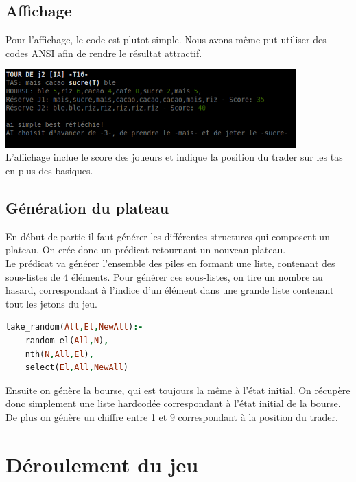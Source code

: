 \documentclass[11pt,a4paper,twoside,french,svgnames]{report}
\begin{document}
\subsection{Affichage}
Pour l'affichage, le code est plutot simple. Nous avons même put utiliser des codes ANSI afin de rendre le résultat attractif.
\begin{center}
\includegraphics[height=3cm]{screen.png}\\
\vspace{2.5cm}
L'affichage inclue le score des joueurs et indique la position du trader sur les tas en plus des basiques.
\subsection{Génération du plateau}
En début de partie il faut générer les différentes structures qui composent un plateau. On crée donc un prédicat retournant un nouveau plateau.\\
Le prédicat va générer l'ensemble des piles en formant une liste, contenant des sous-listes de 4 éléments. Pour générer ces sous-listes, on tire un nombre au hasard, correspondant à l'indice d'un élément dans une grande liste contenant tout les jetons du jeu.
\begin{lstlisting}[language=prolog]
take_random(All,El,NewAll):-
	random_el(All,N),
	nth(N,All,El),
	select(El,All,NewAll)
\end{lstlisting}
Ensuite on génère la bourse, qui est toujours la même à l'état initial. On récupère donc simplement une liste hardcodée correspondant à l'état initial de la bourse.\\
De plus on génère un chiffre entre 1 et 9 correspondant à la position du trader.

\section{Déroulement du jeu}

\end{center}
\end{document}
